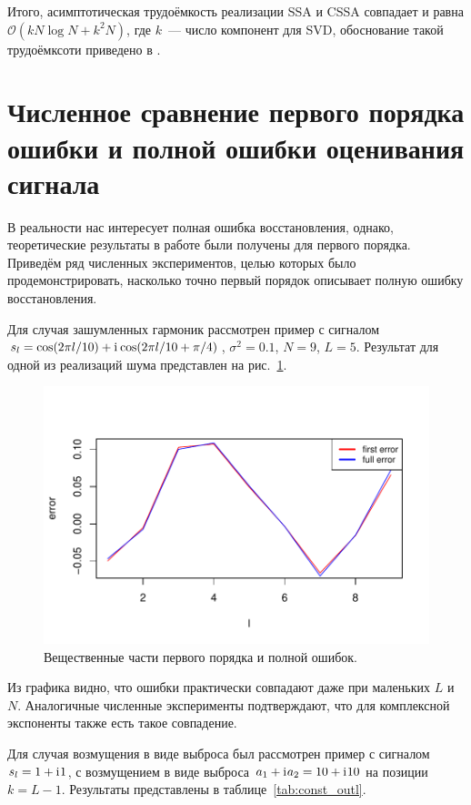 \documentclass[12pt,a4paper]{article}
\begin{document}
Итого, асимптотическая трудоёмкость реализации SSA и CSSA совпадает и равна $\mathcal{O}(k N \log N + k^2 N)$, где $k$~--- число компонент для SVD, обоснование такой трудоёмксоти приведено в \cite{Korobeynikov2010}.

\section{Численное сравнение первого порядка ошибки и полной ошибки оценивания сигнала}
\label{sec:results}

В реальности нас интересует полная ошибка восстановления, однако, теоретические результаты в работе были получены для первого порядка. Приведём ряд численных экспериментов, целью которых было продемонстрировать, насколько точно первый порядок описывает полную ошибку восстановления.

Для случая зашумленных гармоник рассмотрен пример с сигналом $s_l = \cos(2 \pi l / 10) + \mathrm{i}\mkern1mu\cos(2 \pi l / 10 + \pi/4)$, $\sigma^2 = 0.1$, $N = 9$, $L = 5$. Результат для одной из реализаций шума представлен на рис.~\ref{fig:harm_noise}.

\begin{figure}[H]
	\begin{center}
		\includegraphics[width=0.6\linewidth]{img/first_vs_full_re.pdf}
		\caption{Вещественные части первого порядка и полной ошибок.}
		\label{fig:harm_noise}
	\end{center}
\end{figure}

Из графика видно, что ошибки практически совпадают даже при маленьких $L$ и $N$. Аналогичные численные эксперименты подтверждают, что для комплексной экспоненты также есть такое совпадение.

Для случая возмущения в виде выброса был рассмотрен пример с сигналом $s_l = 1 + \mathrm{i}\mkern1mu 1$, с возмущением в виде выброса $a_1 + \mathrm{i}\mkern1mu a_2 = 10 + \mathrm{i}\mkern1mu 10$ на позиции $k = L - 1$. Результаты представлены в таблице~\ref{tab:const_outl}.
\end{document}
